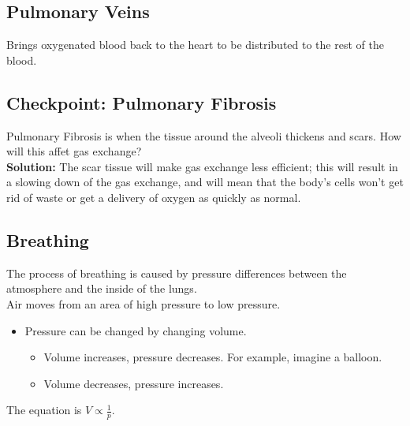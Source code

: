 \documentclass[12pt]{report}
\begin{document}
\subsection{Pulmonary Veins}
\begin{definition}
    Brings oxygenated blood back to the heart to be distributed to the rest of the blood.
\end{definition}

\subsection{Checkpoint: Pulmonary Fibrosis}
Pulmonary Fibrosis is when the tissue around the alveoli thickens and scars. How will this affet gas exchange?\\ 

\textbf{Solution:} The scar tissue will make gas exchange less efficient; this will result in a slowing down of the gas exchange, and will mean that the body's cells won't get rid of waste or get a delivery of oxygen as quickly as normal.

\subsection{Breathing}
\begin{definition}[Breathing]
    The process of breathing is caused by pressure differences between the atmosphere and the inside of the lungs.\\ 

    Air moves from an area of high pressure to low pressure.
    \begin{itemize}
        \item{Pressure can be changed by changing volume.}
            \begin{itemize}
                \item{Volume increases, pressure decreases. For example, imagine a balloon.}
                \item{Volume decreases, pressure increases.}
            \end{itemize}
    \end{itemize}
    The equation is $V\propto \frac{1}{p}.$
\end{definition}
\end{document}
